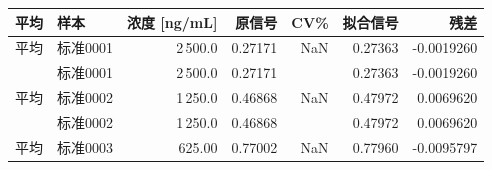 \documentclass[UTF8,10pt,a4paper,fontset=fandol]{ctexart}
\newcommand{\fieldvalue}[1]{#1}
\begin{document}
\small
\begin{tabularx}{\textwidth}{l l r r r r r}
\textbf{平均} & \textbf{样本} & \textbf{浓度 [ng/mL]} &
\textbf{原信号} & \textbf{CV\%} & \textbf{拟合信号} & \textbf{残差}\\
\hline
平均 &
\fieldvalue{标准0001} &
\fieldvalue{2\,500.0} &
\fieldvalue{0.27171} &
\fieldvalue{NaN} &
\fieldvalue{0.27363} &
\fieldvalue{-0.0019260}\\

&
\fieldvalue{标准0001} &
\fieldvalue{2\,500.0} &
\fieldvalue{0.27171} &
&
\fieldvalue{0.27363} &
\fieldvalue{-0.0019260}\\

平均 &
\fieldvalue{标准0002} &
\fieldvalue{1\,250.0} &
\fieldvalue{0.46868} &
\fieldvalue{NaN} &
\fieldvalue{0.47972} &
\fieldvalue{0.0069620}\\

&
\fieldvalue{标准0002} &
\fieldvalue{1\,250.0} &
\fieldvalue{0.46868} &
&
\fieldvalue{0.47972} &
\fieldvalue{0.0069620}\\

平均 &
\fieldvalue{标准0003} &
\fieldvalue{625.00} &
\fieldvalue{0.77002} &
\fieldvalue{NaN} &
\fieldvalue{0.77960} &
\fieldvalue{-0.0095797}\\


\end{tabularx}
\end{document}
